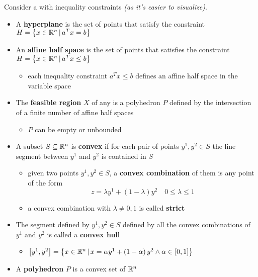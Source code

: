 \documentclass[english]{article}
\begin{document}
\bigskip
Consider a \LP with inequality constraints \textit{(as it's easier to visualize)}.

\begin{itemize}
  \item A \textbf{hyperplane} is the set of points that satisfy the constraint
        \( H = \left\{ x \in \mathbb{R}^n \, | \, a^T x = b \right\} \)
  \item An \textbf{affine half space} is the set of points that satisfies the constraint
        \(H = \left\{ x \in \mathbb{R}^n \, | \, a^T x \leq b \right\} \)
        \begin{itemize}[label=\(\rightarrow\)]
          \item each inequality constraint \(a^T x \leq b\) defines an affine half space in the variable space
        \end{itemize}
  \item The \textbf{feasible region} \(X\) of any \LP is a polyhedron \(P\) defined by the intersection of a finite number of affine half spaces
        \begin{itemize}[label=\(\rightarrow\)]
          \item \(P\) can be empty or unbounded
        \end{itemize}
  \item A subset \(S \subseteq \mathbb{R}^n\) is \textbf{convex} if for each pair of points \(y^1, y^2 \in S\) the line segment between \(y^1\) and \(y^2\) is contained in \(S\)
        \begin{itemize}[label=\(\rightarrow\)]
          \item given two points \(y^1, y^2 \in S\), a \textbf{convex combination} of them is any point of the form
                \[ z = \lambda y^1 + \left( 1 - \lambda \right) y^2 \quad 0 \leq \lambda \leq 1 \]
          \item a convex combination with \(\lambda \neq 0, 1\) is called \textbf{strict}
        \end{itemize}
  \item The segment defined by \(y^1, y^2 \in S\) defined by all the convex combinations of \(y^1\) and \(y^2\) is called a \textbf{convex hull}
        \begin{itemize}[label=\(\rightarrow\)]
          \item \(\left[ y^1, y^2 \right] = \left\{ x \in \mathbb{R}^n \, | \, x = \alpha y^1 + \left( 1-\alpha \right) y^2 \land \alpha \in \left[ 0, 1 \right] \right\}\)
        \end{itemize}
  \item A \textbf{polyhedron} \(P\) is a convex set of \(\mathbb{R}^n\)

\end{itemize}
\end{document}

